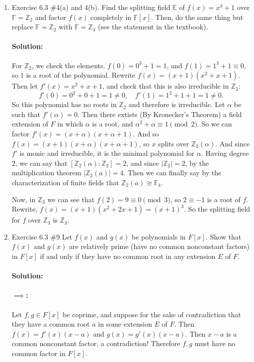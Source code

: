 \documentclass{article}
\begin{document}
\begin{enumerate}
\item Exercise 6.3 \#4(a) and 4(b). Find the splitting field $\mathbb{E}$ of $f(x)=x^3+1$ over $\mathbb{F}=\mathbb{Z}_2$
and factor $f(x)$ completely in $\mathbb{F}[x].$ Then, do the same thing but replace $\mathbb{F}=\mathbb{Z}_2$
with $\mathbb{F}=\mathbb{Z}_3$ (see the statement in the textbook).

\paragraph{Solution:} For $\mathbb{Z}_2$, we check the elements. $f(0)=0^3+1=1$, and $f(1)=1^3+1\equiv 0$, so $1$ is a root of the polynomial.
Rewrite $f(x)=(x+1)(x^2+x+1)$. Then let $f'(x)=x^2+x+1$, and check that this is also irreducible in $\mathbb{Z}_2$:
\[
f'(0)=0^2+0+1= 1\neq 0,\quad f'(1)=1^2+1+1=1\neq 0
.\] 
So this polynomial has no roots in $\mathbb{Z}_2$ and therefore is irreducible. Let $\alpha$ be such that $f'(\alpha)=0$. Then there extists (By Kronecker's Theorem) a field extension
of $F$ in which $\alpha$ is a root, and $\alpha^2+\alpha\equiv  1\pmod{2} $.
So we can factor $f'(x)=(x+\alpha)(x+\alpha+1)$. And so $f(x)=(x+1)(x+\alpha)(x+\alpha+1)$, so $x$ splits over $\mathbb{Z}_2(\alpha)$.
And since  $f'$ is monic and irreducible, it is the minimal polynomial for $\alpha$. Having degree $2$, we can say that $[\mathbb{Z}_2(\alpha):\mathbb{Z}_2]=2$, and since
$|\mathbb{Z}_2|=2$, by the multiplication theorem $|\mathbb{Z}_2(a)|=4$. Then we can finally say by the characterization of finite fields that
$\mathbb{Z}_2(a)\cong \mathbb{F}_4$.

Now, in $\mathbb{Z}_3$ we can see that $f(2)=9\equiv 0\pmod{3} $, so $2\equiv -1$ is a root of $f$. Rewrite, $f(x)=(x+1)(x^2+2x+1)=(x+1)^3$. So the splitting field
for $f$ over $\mathbb{Z}_3$ is $\mathbb{Z}_3$.

\item Exercise 6.3 \#9 Let $f(x)$ and $g(x)$ be polynomials in $F[x].$ Show that $f(x)$ and $g(x)$
are relatively prime (have no common nonconstant factors) in $F[x]$ if and only if
they have no common root in any extension $E$ of $F.$

\paragraph{Solution: }
\paragraph{$\implies$: }
Let $f,g\in F[x]$ be coprime, and suppose for the sake of contradiction that they have a common root $a$ in some extension $E$ of $F$.
Then $f(x)=f'(x)(x-a)$ and $g(x)=g'(x)(x-a)$. Then  $x-a$ is a common nonconstant factor, a contradiction!
Therefore $f,g$ must have no common factor in $F[x]$.

\end{enumerate}
\end{document}
